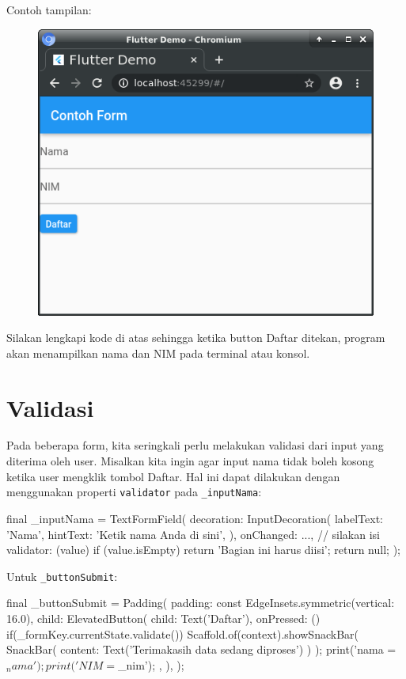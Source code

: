 \documentclass[a4paper,11pt]{article} %
\newcommand{\txtinline}[1]{\texttt{#1}}
\begin{document}
Contoh tampilan:
\begin{figure}[h]
{\centering
\includegraphics[scale=0.5]{images/simpleform001.png}
\par}
\end{figure}

Silakan lengkapi kode di atas sehingga ketika button Daftar ditekan, program
akan menampilkan nama dan NIM pada terminal atau konsol.


\section{Validasi}

Pada beberapa form, kita seringkali perlu melakukan validasi dari input yang diterima
oleh user. Misalkan kita ingin agar input nama tidak boleh kosong ketika user mengklik
tombol Daftar.
Hal ini dapat dilakukan dengan menggunakan properti \txtinline{validator} pada
\txtinline{_inputNama}:
\begin{dartcode}
final _inputNama = TextFormField(
  decoration: InputDecoration(
    labelText: 'Nama',
    hintText: 'Ketik nama Anda di sini',
  ),
  onChanged: ..., // silakan isi
  validator: (value) {
    if (value.isEmpty) {
      return 'Bagian ini harus diisi';
    }
    return null;
  }
);
\end{dartcode}

Untuk \txtinline{_buttonSubmit}:
\begin{dartcode}
final _buttonSubmit = Padding(
  padding: const EdgeInsets.symmetric(vertical: 16.0),
  child: ElevatedButton(
    child: Text('Daftar'),
    onPressed: () {
      if(_formKey.currentState.validate()) {
        Scaffold.of(context).showSnackBar(
          SnackBar(
            content: Text('Terimakasih data sedang diproses')
          )
        );
        print('nama = $_nama');
        print('NIM  = $_nim');
      }
    },
  ),
);
\end{dartcode}
\end{document}

